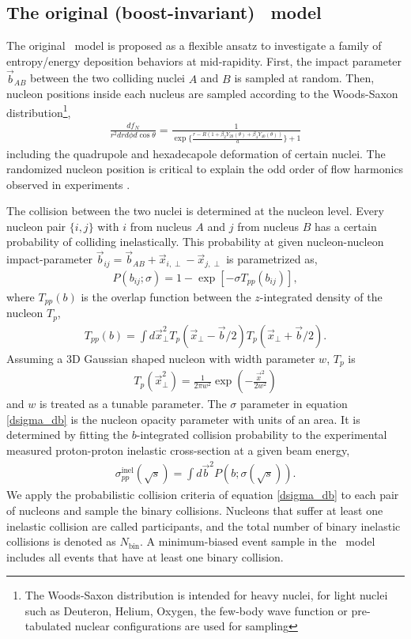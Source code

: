 \subsection{The original (boost-invariant) \trento\ model}
The original \trento\ model is proposed as a flexible ansatz to investigate a family of entropy/energy deposition behaviors at mid-rapidity.
First, the impact parameter $\vec{b}_{AB}$ between the two colliding nuclei $A$ and $B$ is sampled at random.
Then, nucleon positions inside each nucleus are sampled according to the Woods-Saxon distribution\footnote{ \singlespacing  The Woods-Saxon distribution is intended for heavy nuclei, for light nuclei such as Deuteron, Helium, Oxygen, the few-body wave function or pre-tabulated nuclear configurations are used for sampling},
\begin{eqnarray}
\frac{df_N}{r^2 dr d\phi d\cos\theta} = \frac{1}{\exp\{\frac{r-R(1+\beta_2 Y_{20}(\theta)+\beta_4 Y_{40}(\theta))}{a}\}+1}
\end{eqnarray}
including the quadrupole and hexadecapole deformation of certain nuclei.
The randomized nucleon position is critical to explain the odd order of flow harmonics observed in experiments \cite{Alver:2010gr}.

The collision between the two nuclei is determined at the nucleon level. 
Every nucleon pair $\{i, j\}$ with $i$ from nucleus $A$ and $j$ from nucleus $B$ has a certain probability of colliding inelastically.
This probability at given nucleon-nucleon impact-parameter $\vec{b}_{ij} = \vec{b}_{AB} + \vec{x}_{i, \perp} -  \vec{x}_{j, \perp}$ is parametrized as,
\begin{eqnarray}
P(b_{ij}; \sigma) = 1 - \exp\left[-\sigma T_{pp}(b_{ij})\right],
\label{dsigma_db}
\end{eqnarray}
where $T_{pp}(b)$ is the overlap function between the $z$-integrated density of the nucleon $T_p$,
\begin{eqnarray}
T_{pp}(b) = \int d\vec{x}_\perp^2 T_p(\vec{x}_\perp-\vec{b}/2) T_p(\vec{x}_\perp+\vec{b}/2).
\end{eqnarray}
Assuming a 3D Gaussian shaped nucleon with width parameter $w$, $T_p$ is
\begin{eqnarray}
T_p(\vec{x}_\perp^2) = \frac{1}{2\pi w^2} \exp\left(-\frac{\vec{x}^2}{2w^2}\right)
\end{eqnarray}
and $w$ is treated as a tunable parameter.
The $\sigma$ parameter in equation \ref{dsigma_db} is the nucleon opacity parameter with units of an area.
It is determined by fitting the $b$-integrated collision probability to the experimental measured proton-proton inelastic cross-section at a given beam energy,
\begin{eqnarray}
\sigma_{pp}^\text{inel}(\sqrt{s}) = \int d\vec{b}^2 P(b; \sigma(\sqrt{s})).
\end{eqnarray}
We apply the probabilistic collision criteria of equation \ref{dsigma_db} to each pair of nucleons and sample the binary collisions. 
Nucleons that suffer at least one inelastic collision are called participants, and the total number of binary inelastic collisions is denoted as $N_{\textrm{bin}}$.
A minimum-biased event sample in the \trento\ model includes all events that have at least one binary collision.

